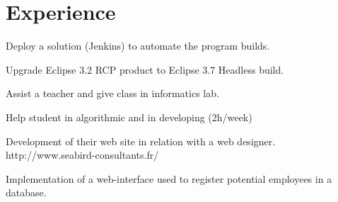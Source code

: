 \documentclass[letterpaper]{deedy-resume} %
\begin{document}
\begin{minipage}[t]{0.66\textwidth} %


\section{Experience}


\vspace{\topsep} %
\begin{tightitemize}
\item Deploy a solution (Jenkins) to automate the program builds.
\item Upgrade Eclipse 3.2 RCP product to Eclipse 3.7 Headless build.
\end{tightitemize}

\sectionspace %



\begin{tightitemize}
\item Assist a teacher and give class in informatics lab.
\item Help student in algorithmic and in developing (2h/week)
\end{tightitemize}

\sectionspace %



\begin{tightitemize}
\item Development of their web site in relation with a web designer. http://www.seabird-consultants.fr/
\item Implementation of a web-interface used to register potential employees in a database.
\end{tightitemize}


\end{minipage}
\end{document}
